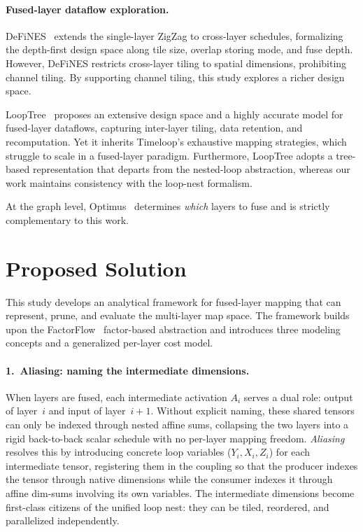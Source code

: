 \documentclass[11pt,a4paper,twocolumn]{article}
\begin{document}
\paragraph{Fused-layer dataflow exploration.}
DeFiNES~\cite{mei2023defines} extends the single-layer ZigZag to cross-layer schedules, 
formalizing the depth-first design space along tile size, overlap storing mode, and fuse depth.
However, DeFiNES restricts cross-layer tiling to spatial dimensions, prohibiting channel tiling. By supporting channel tiling, this study explores a richer design space.

LoopTree~\cite{gilbert2024looptree} proposes an extensive design
space and a highly accurate model for fused-layer dataflows,
capturing inter-layer tiling, data retention, and recomputation.
Yet it inherits Timeloop's exhaustive mapping strategies, which
struggle to scale in a fused-layer paradigm.
Furthermore, LoopTree adopts a tree-based representation that
departs from the nested-loop abstraction, whereas our work
maintains consistency with the loop-nest formalism.

At the graph level, Optimus~\cite{10.1145/3461648.3463848} determines \emph{which} layers to fuse and is strictly
complementary to this work.



\section*{Proposed Solution}

This study develops an analytical framework for fused-layer mapping
that can represent, prune, and evaluate the multi-layer map space.
The framework builds upon the FactorFlow~\cite{Factorflow}
factor-based abstraction and introduces three modeling concepts and
a generalized per-layer cost model.

\paragraph{1.\ Aliasing: naming the intermediate dimensions.}
When layers are fused, each intermediate activation $A_i$ serves a
dual role: output of layer~$i$ and input of layer~$i\!+\!1$.
Without explicit naming, these shared tensors can only be indexed
through nested affine sums, collapsing the two layers into a rigid
back-to-back scalar schedule with no per-layer mapping freedom.
\emph{Aliasing} resolves this by introducing concrete loop variables
($Y_i, X_i, Z_i$) for each intermediate tensor, registering them in
the coupling so that the producer indexes the tensor through native
dimensions while the consumer indexes it through affine dim-sums
involving its own variables.
The intermediate dimensions become first-class citizens of the
unified loop nest: they can be tiled, reordered, and parallelized
independently.
\end{document}
